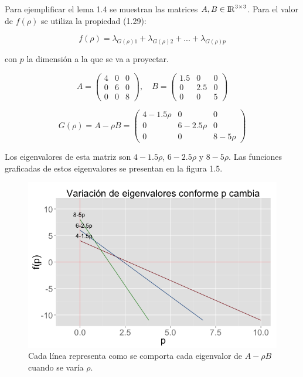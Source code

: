 \begin{example} \label{ex:1}
Para ejemplificar el lema 1.4 se muestran las matrices $A,B \in {\rm I\!R}^{3 \times 3}$. Para el valor de $f(\rho)$ se utiliza la propiedad (1.29):

$$f(\rho) = \lambda_{G(\rho)1} + \lambda_{G(\rho)2} + ... + \lambda_{G(\rho)p}$$

con $p$ la dimensión a la que se va a proyectar. 


\begin{equation*}
A = \left(\!
    \begin{array}{ccc}
      4 & 0 & 0 \\
      0 & 6 & 0 \\
      0 & 0 & 8 
    \end{array}
  \!\right), \quad
B = \left(\!
    \begin{array}{ccc}
      1.5 & 0 & 0 \\
      0 & 2.5 & 0 \\
      0 & 0 & 5 
    \end{array}
\!\right) 
\end{equation*}



\begin{equation*}
G(\rho) = A- \rho B = \left(\!
    \begin{array}{ccc}
      4-1.5\rho & 0 & 0 \\
      0 & 6-2.5\rho & 0 \\
      0 & 0 & 8-5\rho 
    \end{array}   	
      \!\right) 
\end{equation*}

Los eigenvalores de esta matriz son $4-1.5\rho$,  $6-2.5\rho$ y  $8-5\rho$. Las funciones graficadas de estos eigenvalores se presentan en la figura 1.5.

\begin{figure}[!ht] \label{Fig1.4}
  \centering
  \includegraphics[width=1\textwidth]{Figures/Chapter2_3eigen}  
  \caption[Gráfica de los eigenvalores en función de $\rho$.] {Cada línea representa como se comporta cada eigenvalor de $A- \rho B$ cuando se varía $\rho$.}
\end{figure}


\end{example}
